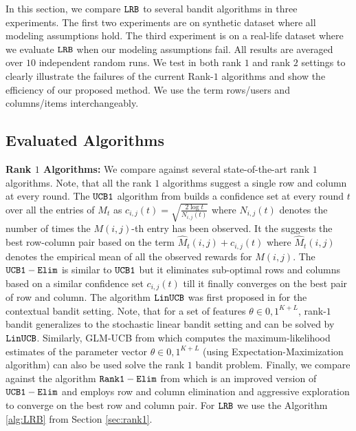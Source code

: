 In this section, we compare ${\tt LRB}$ to several bandit algorithms in three experiments. The first two experiments are on synthetic dataset where all modeling assumptions hold. The third experiment is on a real-life dataset where we evaluate ${\tt LRB}$ when our modeling assumptions fail. All results are averaged over $10$ independent random runs. We test in both rank $1$ and rank $2$ settings to clearly illustrate the failures of the current Rank-$1$ algorithms and show the efficiency of our proposed method. We use the term rows/users and columns/items interchangeably.

\subsection{Evaluated Algorithms}

\textbf{Rank $1$ Algorithms:} We compare against several state-of-the-art rank $1$ algorithms. Note, that all the rank $1$ algorithms suggest a single row and column at every round. The ${\tt UCB1}$ algorithm from \citet{auer2002finite} builds a confidence set at every round $t$ over all the entries of $M_t$ as $c_{i, j}(t) = \sqrt{\frac{2\log t}{N_{i, j}(t)}}$ where $N_{i, j}(t)$ denotes the number of times the $M(i,j)$-th entry has been observed. It the suggests the best row-column pair based on the term $\hat{M}_{t}(i,j) + c_{i, j}(t)$ where $\hat{M}_{t}(i,j)$ denotes the empirical mean of all the observed rewards for $M(i,j)$. The ${\tt UCB1-Elim}$ \citep{auer2010ucb} is similar to ${\tt UCB1}$ but it eliminates sub-optimal rows and columns  based on a similar confidence set  $c_{i, j}(t)$ till it finally converges on the best pair of row and column. The algorithm ${\tt LinUCB}$ was first proposed in \citet{li2010contextual} for the contextual bandit setting. Note, that for a set of features $\theta \in {0,1}^{K+L}$, rank-$1$ bandit generalizes to the stochastic linear bandit setting and can be solved by ${\tt LinUCB}$. Similarly, GLM-UCB from  \citet{filippi2010parametric} which computes the maximum-likelihood estimates of the parameter vector $\theta \in {0,1}^{K+L}$ (using Expectation-Maximization algorithm) can also be used solve the rank $1$ bandit problem. Finally, we compare against the algorithm $\tt Rank1-Elim$ from \citet{katariya2016stochastic} which is an improved version of ${\tt UCB1-Elim}$ and employs row and column elimination and aggressive exploration to converge on the best row and column pair. For ${\tt LRB}$ we use the Algorithm \ref{alg:LRB} from Section \ref{sec:rank1}. 


